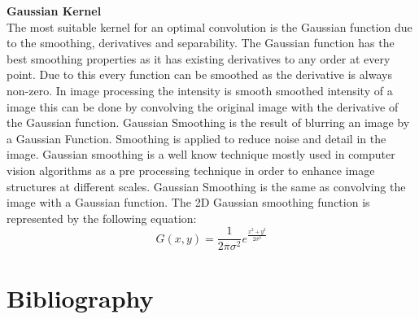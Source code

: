 \documentclass[a4paper]{article}
\begin{document}
\begin{appendices}
\noindent\textbf{Gaussian Kernel}\\
The most suitable kernel for an optimal convolution is the Gaussian function due to the smoothing, derivatives and separability. The Gaussian function has the best smoothing properties as it has existing derivatives to any order at every point. Due to this every function can be smoothed as the derivative is always non-zero. In image processing the intensity is smooth smoothed intensity of a image this can be done by convolving the original image with the derivative of the Gaussian function. Gaussian Smoothing is the result of blurring an image by a Gaussian Function. Smoothing is applied to reduce noise and detail in the image. Gaussian smoothing is a well know technique mostly used in computer vision algorithms as a pre processing technique in order to enhance image structures at different scales. Gaussian Smoothing is the same as convolving the image with a Gaussian function. The 2D Gaussian smoothing function is represented by the following equation:
\begin{equation*}
G(x,y) = \frac{1}{2\pi\sigma^2}e^{\frac{x^2 + y^2}{2\sigma^2}}
\end{equation*}

\end{appendices}

\newpage

\section{Bibliography}
\renewcommand{\section}[2]{}


\end{document}

